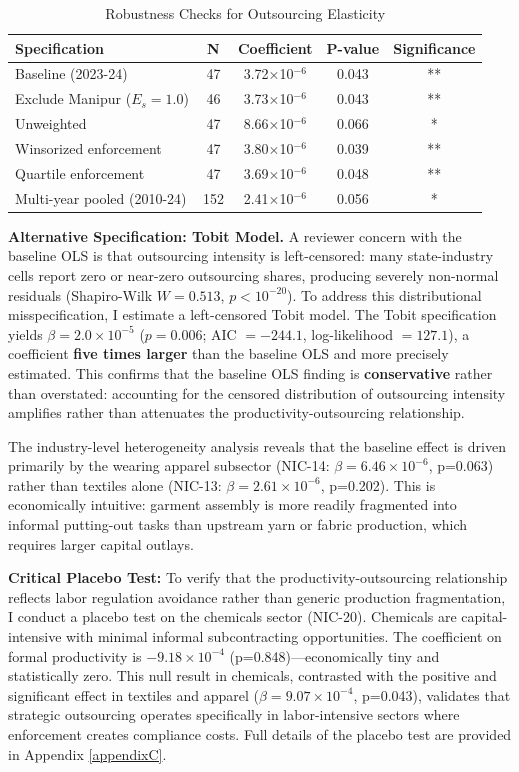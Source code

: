 \begin{table}[H]
	\centering
	\caption{Robustness Checks for Outsourcing Elasticity}
	\label{tab:outsourcing_robustness}
	\begin{tabular}{lcccc}
		\toprule
		Specification & N & Coefficient & P-value & Significance \\
		\midrule
		Baseline (2023-24) & 47 & 3.72$\times$10$^{-6}$ & 0.043 & ** \\
		Exclude Manipur ($E_s=1.0$) & 46 & 3.73$\times$10$^{-6}$ & 0.043 & ** \\
		Unweighted & 47 & 8.66$\times$10$^{-6}$ & 0.066 & * \\
		Winsorized enforcement & 47 & 3.80$\times$10$^{-6}$ & 0.039 & ** \\
		Quartile enforcement & 47 & 3.69$\times$10$^{-6}$ & 0.048 & ** \\
		Multi-year pooled (2010-24) & 152 & 2.41$\times$10$^{-6}$ & 0.056 & * \\
		\bottomrule
	\end{tabular}
\end{table}

\textbf{Alternative Specification: Tobit Model.} A reviewer concern with the baseline OLS is that outsourcing intensity is left-censored: many state-industry cells report zero or near-zero outsourcing shares, producing severely non-normal residuals (Shapiro-Wilk $W = 0.513$, $p < 10^{-20}$). To address this distributional misspecification, I estimate a left-censored Tobit model. The Tobit specification yields $\beta = 2.0 \times 10^{-5}$ ($p = 0.006$; AIC $= -244.1$, log-likelihood $= 127.1$), a coefficient \textbf{five times larger} than the baseline OLS and more precisely estimated. This confirms that the baseline OLS finding is \textbf{conservative} rather than overstated: accounting for the censored distribution of outsourcing intensity amplifies rather than attenuates the productivity-outsourcing relationship.

The industry-level heterogeneity analysis reveals that the baseline effect is driven primarily by the wearing apparel subsector (NIC-14: $\beta = 6.46 \times 10^{-6}$, p=0.063) rather than textiles alone (NIC-13: $\beta = 2.61 \times 10^{-6}$, p=0.202). This is economically intuitive: garment assembly is more readily fragmented into informal putting-out tasks than upstream yarn or fabric production, which requires larger capital outlays.

\noindent \textbf{Critical Placebo Test:} To verify that the productivity-outsourcing relationship reflects labor regulation avoidance rather than generic production fragmentation, I conduct a placebo test on the chemicals sector (NIC-20). Chemicals are capital-intensive with minimal informal subcontracting opportunities. The coefficient on formal productivity is $-9.18 \times 10^{-4}$ (p=0.848)—economically tiny and statistically zero. This null result in chemicals, contrasted with the positive and significant effect in textiles and apparel ($\beta=9.07 \times 10^{-4}$, p=0.043), validates that strategic outsourcing operates specifically in labor-intensive sectors where enforcement creates compliance costs. Full details of the placebo test are provided in Appendix \ref{appendixC}.

